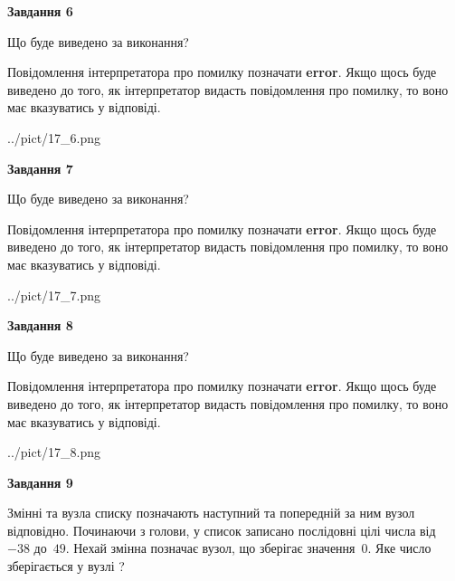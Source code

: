 \documentclass[12pt, ukrainian]{article}
\begin{document}
{\begin {large}
{\begin {center}\textbf{Завдання 6}\end {center}}\par
Що буде виведено за виконання?

Повідомлення інтерпретатора про помилку позначати \textbf{error}.
Якщо щось буде виведено до того, як інтерпретатор видасть повідомлення про помилку, 
то воно має вказуватись у відповіді. \par


\begin{center}
	{../pict/17_6.png}
\end{center}
\newpage

{\begin {center}\textbf{Завдання 7}\end {center}}\par
Що буде виведено за виконання?

Повідомлення інтерпретатора про помилку позначати \textbf{error}.
Якщо щось буде виведено до того, як інтерпретатор видасть повідомлення про помилку, 
то воно має вказуватись у відповіді. \par


\begin{center}
	{../pict/17_7.png}
\end{center}
\newpage

{\begin {center}\textbf{Завдання 8}\end {center}}\par
Що буде виведено за виконання?

Повідомлення інтерпретатора про помилку позначати \textbf{error}.
Якщо щось буде виведено до того, як інтерпретатор видасть повідомлення про помилку, 
то воно має вказуватись у відповіді. \par


\begin{center}
	{../pict/17_8.png}
\end{center}
\newpage

{\begin {center}\textbf{Завдання 9}\end {center}}\par
Змінні  та  вузла списку позначають наступний та попередній за ним вузол відповідно. Починаючи з голови, у список записано послідовні цілі числа від~$-38$ до~$49$. Нехай змінна  позначає вузол, що зберігає значення~$0$.
Яке число зберігається у вузлі  ?\par
\newpage


\end{large}}
\end{document}
